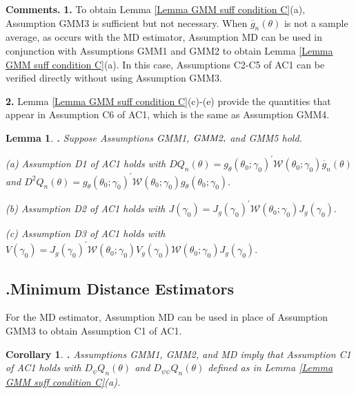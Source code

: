 \documentclass[12pt,thmsb,titlepage,final,oneside,letterpaper]{article}
\newtheorem{corollary}{Corollary}[section]
\newtheorem{lemma}{Lemma}[section]
\begin{document}
\noindent \textbf{Comments.} \textbf{1.} To obtain Lemma \ref{Lemma GMM suff
condition C}(a), Assumption GMM3 is sufficient but not necessary. When $%
\overline{g}_{n}(\theta )$ is not a sample average, as occurs with the MD
estimator, Assumption MD can be used in conjunction with Assumptions GMM1
and GMM2 to obtain Lemma \ref{Lemma GMM suff condition C}(a). In this case,
Assumptions C2-C5 of AC1 can be verified directly without using Assumption
GMM3.

\textbf{2.} Lemma \ref{Lemma GMM suff condition C}(c)-(e) provide the
quantities that appear in Assumption C6 of AC1, which is the same as
Assumption GMM4.\medskip

\begin{lemma}
\textbf{\hspace{-0.08in}.} \label{Lemma GMM Sufficient D}Suppose Assumptions 
\emph{GMM1, }$\emph{GMM2,}$ and \emph{GMM5 }hold.

\noindent \emph{(a)} Assumption \emph{D1} of \emph{AC1 }holds with $%
DQ_{n}(\theta )=g_{\theta }(\theta _{0};\gamma _{0})^{\prime }\mathcal{W}%
(\theta _{0};\gamma _{0})\overline{g}_{n}(\theta )$ and \newline
$D^{2}Q_{n}(\theta )=g_{\theta }(\theta _{0};\gamma _{0})^{\prime }\mathcal{W%
}(\theta _{0};\gamma _{0})g_{\theta }(\theta _{0};\gamma _{0}).$

\noindent \emph{(b)} Assumption \emph{D2} of \emph{AC1 }holds with $J(\gamma
_{0})=J_{g}(\gamma _{0})^{\prime }\mathcal{W}(\theta _{0};\gamma
_{0})J_{g}\left( \gamma _{0}\right) .$

\noindent \emph{(c)} Assumption \emph{D3} of \emph{AC1 }holds with $V(\gamma
_{0})=J_{g}(\gamma _{0})^{\prime }\mathcal{W}(\theta _{0};\gamma
_{0})V_{g}\left( \gamma _{0}\right) \mathcal{W}(\theta _{0};\gamma
_{0})J_{g}\left( \gamma _{0}\right) .$
\end{lemma}

\subsection{\hspace{-0.23in}\textbf{.}\hspace{0.18in}Minimum Distance
Estimators}

\hspace{0.25in}For the MD estimator, Assumption MD can be used in place of
Assumption GMM3 to obtain Assumption C1 of AC1.

\begin{corollary}
\textbf{\hspace{-0.08in}.} \label{Corollary MD}Assumptions \emph{GMM1,} 
\emph{GMM2,} and \emph{MD} imply that Assumption \emph{C1} of \emph{AC1 }%
holds with $D_{\psi }Q_{n}(\theta )$ and $D_{\psi \psi }Q_{n}(\theta )$
defined as in Lemma \emph{\ref{Lemma GMM suff condition C}(a).}
\end{corollary}
\end{document}
